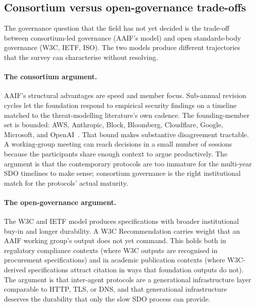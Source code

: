 \subsection{Consortium versus open-governance trade-offs}
\label{sec:governance:tradeoff}

The governance question that the field has not yet
decided is the trade-off between consortium-led
governance (AAIF's model) and open standards-body
governance (W3C, IETF, ISO). The two models produce
different trajectories that the survey can characterise
without resolving.

\paragraph{The consortium argument.}
AAIF's structural advantages are speed and member
focus. Sub-annual revision cycles let the foundation
respond to empirical security findings on a timeline
matched to the threat-modelling literature's own
cadence. The founding-member set is bounded: AWS,
Anthropic, Block, Bloomberg, Cloudflare, Google,
Microsoft, and OpenAI~\cite{lf_aaif}. That bound makes
substantive disagreement tractable. A working-group meeting can reach
decisions in a small number of sessions because the
participants share enough context to argue
productively. The argument is that the contemporary
protocols are too immature for the multi-year SDO
timelines to make sense; consortium governance is the
right institutional match for the protocols' actual
maturity.

\paragraph{The open-governance argument.}
The W3C and IETF model produces specifications with
broader institutional buy-in and longer durability. A
W3C Recommendation carries weight that an AAIF working
group's output does not yet command. This holds both in
regulatory compliance contexts (where W3C outputs are
recognised in procurement specifications) and in
academic publication contexts (where W3C-derived
specifications attract citation in ways that
foundation outputs do not). The argument is that
inter-agent protocols are a generational infrastructure
layer comparable to HTTP, TLS, or DNS, and that
generational infrastructure deserves the durability
that only the slow SDO process can provide.

